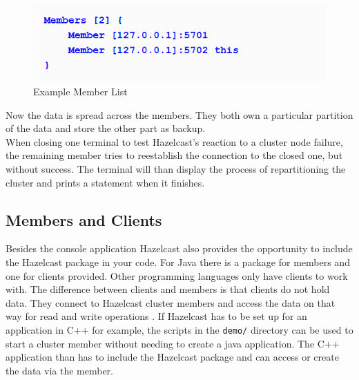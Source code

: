 \begin{flushleft}
\begin{figure}[ht]
    \includegraphics{content/images/hazelcastMembers.PNG}
    \caption{Example Member List \cite{johns2015}}
\end{figure}
\end{flushleft}
Now the data is spread across the members. They both own a particular partition of the data and store the other part as backup.\\
When closing one terminal to test Hazelcast's reaction to a cluster node failure, the remaining member tries to reestablish the connection to the closed one, but without success. The terminal will than display the process of repartitioning the cluster and prints a statement when it finishes.
\subsection*{Members and Clients}
Besides the console application Hazelcast also provides the opportunity to include the Hazelcast package in your code. For Java there is a package for members and one for clients provided. Other programming languages only have clients to work with. The difference between clients and members is that clients do not hold data. They connect to Hazelcast cluster members and access the data on that way for read and write operations \cite{hazelcastmanual}. If Hazelcast has to be set up for an application in C++ for example, the scripts in the \texttt{demo/} directory can be used to start a cluster member without needing to create a java application. The C++ application than has to include the Hazelcast package and can access or create the data via the member.
